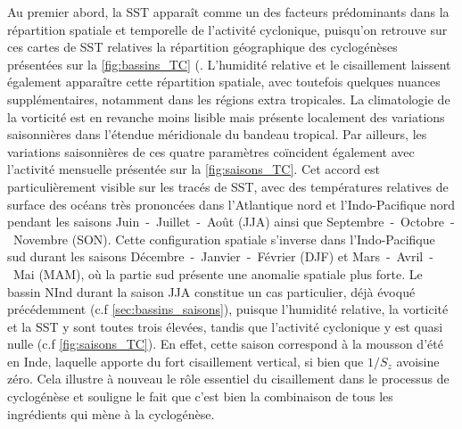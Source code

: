 \documentclass[../main.tex]{subfiles}
\begin{document}
Au premier abord, la SST apparaît comme un des facteurs prédominants dans la répartition spatiale et temporelle de l'activité cyclonique, puisqu'on retrouve sur
ces cartes de SST relatives la répartition géographique des cyclogénèses présentées sur la \cref{fig:bassins_TC} (. L'humidité relative et le cisaillement
laissent également apparaître cette répartition spatiale, avec toutefois quelques nuances supplémentaires, notamment dans les régions extra tropicales. La
climatologie de la vorticité est en revanche moins lisible mais présente localement des variations saisonnières dans l'étendue méridionale du bandeau tropical.
Par ailleurs, les variations saisonnières de ces quatre paramètres coïncident également avec l'activité mensuelle présentée sur la \cref{fig:saisons_TC}. Cet
accord est particulièrement visible sur les tracés de SST, avec des températures relatives de surface des océans très prononcées dans l'Atlantique nord et
l'Indo-Pacifique nord pendant les saisons Juin~-~Juillet~-~Août (JJA) ainsi que Septembre~-~Octobre~-~Novembre (SON). Cette configuration spatiale s'inverse
dans l'Indo-Pacifique sud durant les saisons Décembre~-~Janvier~-~Février (DJF) et Mars~-~Avril~-~Mai (MAM), où la partie sud présente une anomalie spatiale
plus forte. Le bassin NInd durant la saison JJA constitue un cas particulier, déjà évoqué précédemment (c.f \cref{sec:bassins_saisons}), puisque l'humidité
relative, la vorticité et la SST y sont toutes trois élevées, tandis que l'activité cyclonique y est quasi nulle (c.f \cref{fig:saisons_TC}). En effet, cette
saison correspond à la mousson d'été en Inde, laquelle apporte du fort cisaillement vertical, si bien que $1/S_z$ avoisine zéro. Cela illustre à nouveau le rôle
essentiel du cisaillement dans le processus de cyclogénèse et souligne le fait que c'est bien la combinaison de tous les ingrédients qui mène à la cyclogénèse.
\end{document}
